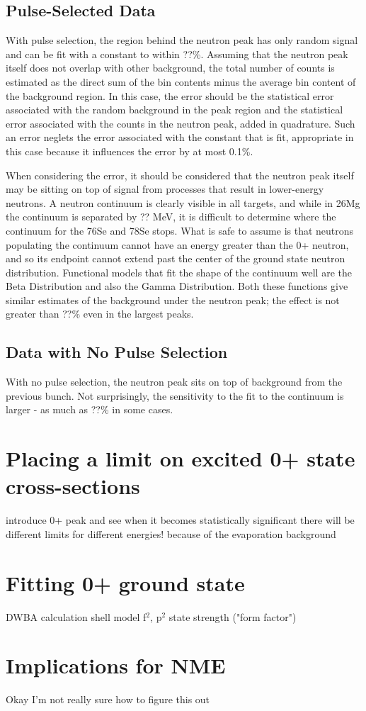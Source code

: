 \subsection{Pulse-Selected Data}
With pulse selection, the region behind the neutron peak has only random signal and can be fit with a constant to within ??\%.  Assuming that the neutron peak itself does not overlap with other background, the total number of counts is estimated as the direct sum of the bin contents minus the average bin content of the background region.  In this case, the error should be the statistical error associated with the random background in the peak region and the statistical error associated with the counts in the neutron peak, added in quadrature.  Such an error neglets the error associated with the constant that is fit, appropriate in this case because it influences the error by at most 0.1\%.

When considering the error, it should be considered that the neutron peak itself may be sitting on top of signal from processes that result in lower-energy neutrons.  A neutron continuum is clearly visible in all targets, and while in 26Mg the continuum is separated by ?? MeV, it is difficult to determine where the continuum for the 76Se and 78Se stops.  What is safe to assume is that neutrons populating the continuum cannot have an energy greater than the 0+ neutron, and so its endpoint cannot extend past the center of the ground state neutron distribution.  Functional models that fit the shape of the continuum well are the Beta Distribution and also the Gamma Distribution.  Both these functions give similar estimates of the background under the neutron peak; the effect is not greater than ??\% even in the largest peaks.

\subsection{Data with No Pulse Selection}
With no pulse selection, the neutron peak sits on top of background from the previous bunch.  Not surprisingly, the sensitivity to the fit to the continuum is larger - as much as ??\% in some cases.

\section{Placing a limit on excited 0+ state cross-sections}
introduce 0+ peak and see when it becomes statistically significant
there will be different limits for different energies!  because of the evaporation background

\section{Fitting 0+ ground state}
DWBA calculation
shell model
f$^2$, p$^2$ state strength ("form factor")

\section{Implications for \zvbb NME}
Okay I'm not really sure how to figure this out

%
% 
% 
